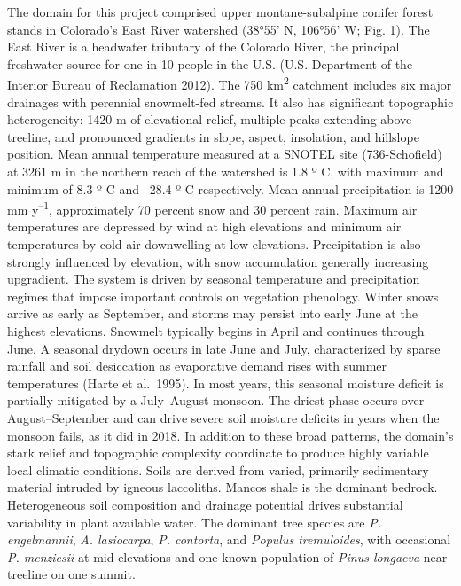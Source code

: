 \documentclass[
  12pt,
]{article}
\begin{document}
The domain for this project comprised upper montane-subalpine conifer
forest stands in Colorado's East River watershed (38°55' N, 106°56' W;
Fig. 1). The East River is a headwater tributary of the Colorado River,
the principal freshwater source for one in 10 people in the U.S. (U.S.
Department of the Interior Bureau of Reclamation 2012). The 750
km\textsuperscript{2} catchment includes six major drainages with
perennial snowmelt-fed streams. It also has significant topographic
heterogeneity: 1420 m of elevational relief, multiple peaks extending
above treeline, and pronounced gradients in slope, aspect, insolation,
and hillslope position. Mean annual temperature measured at a SNOTEL
site (736-Schofield) at 3261 m in the northern reach of the watershed is
1.8 º C, with maximum and minimum of 8.3 º C and --28.4 º C
respectively. Mean annual precipitation is 1200 mm
y\textsuperscript{--1}, approximately 70 percent snow and 30 percent
rain. Maximum air temperatures are depressed by wind at high elevations
and minimum air temperatures by cold air downwelling at low elevations.
Precipitation is also strongly influenced by elevation, with snow
accumulation generally increasing upgradient. The system is driven by
seasonal temperature and precipitation regimes that impose important
controls on vegetation phenology. Winter snows arrive as early as
September, and storms may persist into early June at the highest
elevations. Snowmelt typically begins in April and continues through
June. A seasonal drydown occurs in late June and July, characterized by
sparse rainfall and soil desiccation as evaporative demand rises with
summer temperatures (Harte et al.~1995). In most years, this seasonal
moisture deficit is partially mitigated by a July--August monsoon. The
driest phase occurs over August--September and can drive severe soil
moisture deficits in years when the monsoon fails, as it did in 2018. In
addition to these broad patterns, the domain's stark relief and
topographic complexity coordinate to produce highly variable local
climatic conditions. Soils are derived from varied, primarily
sedimentary material intruded by igneous laccoliths. Mancos shale is the
dominant bedrock. Heterogeneous soil composition and drainage potential
drives substantial variability in plant available water. The dominant
tree species are \emph{P. engelmannii}, \emph{A. lasiocarpa}, \emph{P.
contorta}, and \emph{Populus tremuloides}, with occasional \emph{P.
menziesii} at mid-elevations and one known population of \emph{Pinus
longaeva} near treeline on one summit.
\end{document}
